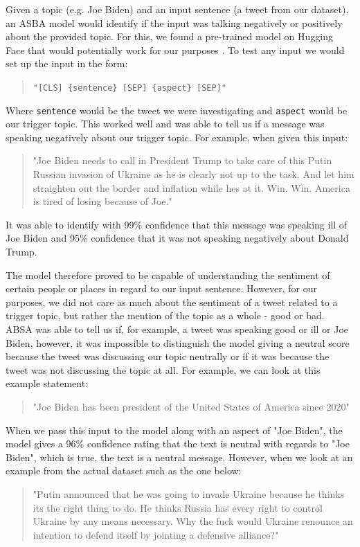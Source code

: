 Given a topic (e.g. Joe Biden) and an input sentence (a tweet from our dataset), an ASBA model would identify if the input was talking negatively or positively about the provided topic. For this, we found a pre-trained model on Hugging Face that would potentially work for our purposes \cite{ABSA}. To test any input we would set up the input in the form:
\begin{quote}
    \verb|"[CLS] {sentence} [SEP] {aspect} [SEP]"|
\end{quote}
Where \verb|sentence| would be the tweet we were investigating and \verb|aspect| would be our trigger topic. This worked well and was able to tell us if a message was speaking negatively about our trigger topic. For example, when given this input:
\begin{quote}
    "Joe Biden needs to call in President Trump to take care of this Putin Russian invasion of Ukraine as he is clearly not up to the task. And let him straighten out the border and inflation while hes at it. Win. Win. America is tired of losing because of Joe."
\end{quote}
It was able to identify with 99\% confidence that this message was speaking ill of Joe Biden and 95\% confidence that it was not speaking negatively about Donald Trump.

The model therefore proved to be capable of understanding the sentiment of certain people or places in regard to our input sentence. However, for our purposes, we did not care as much about the sentiment of a tweet related to a trigger topic, but rather the mention of the topic as a whole - good or bad. ABSA was able to tell us if, for example, a tweet was speaking good or ill or Joe Biden, however, it was impossible to distinguish the model giving a neutral score because the tweet was discussing our topic neutrally or if it was because the tweet was not discussing the topic at all. For example, we can look at this example statement:

\begin{quote}
    "Joe Biden has been president of the United States of America since 2020"
\end{quote}

When we pass this input to the model along with an aspect of "Joe Biden", the model gives a 96\% confidence rating that the text is neutral with regards to "Joe Biden", which is true, the text is a neutral message. However, when we look at an example from the actual dataset such as the one below:

\begin{quote}
    "Putin announced that he was going to invade Ukraine because he thinks its the right thing to do. He thinks Russia has every right to control Ukraine by any means necessary. Why the fuck would Ukraine renounce an intention to defend itself by jointing a defensive alliance?"
\end{quote}

